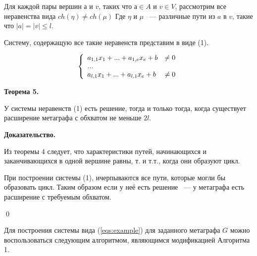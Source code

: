 \documentclass[14pt]{mmcs-article}
\begin{document}

Для каждой пары вершин $а$ и $v$, таких что  $а \in A$ и $v \in V$, рассмотрим все неравенства вида $ch(\eta) \neq ch(\mu)$ Где $\eta$ и $\mu$ ~--- различные пути из $a$ в $v$, такие что $|a| = |v| \leq l$.

Систему, содержащую все такие неравенств представим в виде (1).

\begin{equation}
    \centering
    \left\{
        \begin{array}{ll}
            a_{1,1} x_1 + ... + a_{1,e} x_e + b &\neq 0\\
            ...\\
            a_{l,1} x_1 + ... + a_{l,1} x_e + b &\neq 0\\
        \end{array}
    \right.
    \label{eqs:example}
\end{equation}

\textbf{Теорема 5.}


У системы неравенств (1) есть решение, тогда и только тогда, когда существует расширение метаграфа с обхватом не меньше $2l$.

\textbf{Доказательство.}

Из теоремы 4 следует, что характеристики путей, начинающихся и заканчивающихся в одной вершине равны, т. и т.т., когда они образуют цикл.


При построении системы (1), ичерпываются все пути, которые могли бы образовать цикл. Таким образом если у неё есть решение ~--- у метаграфа есть расширение с требуемым обхватом.

\qed



Для построения системы вида (\ref{eqs:example}) для заданного метаграфа $G$ можно воспользоваться следующим алгоритмом, являющимся модификацией Алгоритма 1.
\end{document}
